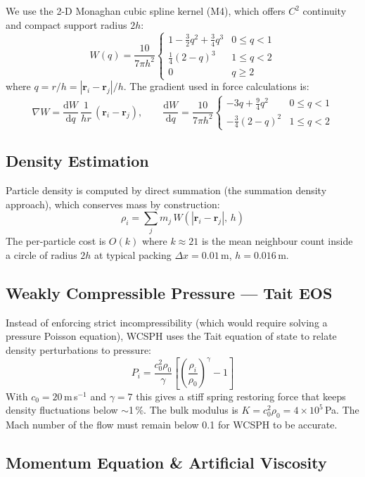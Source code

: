 \documentclass[11pt,a4paper]{article}
\begin{document}
We use the 2-D Monaghan cubic spline kernel (M4), which offers $C^2$ continuity and compact
support radius $2h$:
\[
  W(q) = \frac{10}{7\pi h^2}
  \begin{cases}
    1 - \tfrac{3}{2}q^2 + \tfrac{3}{4}q^3 & 0 \le q < 1 \\[4pt]
    \tfrac{1}{4}(2-q)^3                    & 1 \le q < 2 \\[4pt]
    0                                       & q \ge 2
  \end{cases}
\]
where $q = r/h = |\mathbf{r}_i - \mathbf{r}_j|/h$.  The gradient used in force calculations is:
\[
  \nabla W = \frac{\mathrm{d}W}{\mathrm{d}q}\,\frac{1}{hr}\,(\mathbf{r}_i - \mathbf{r}_j),
  \qquad
  \frac{\mathrm{d}W}{\mathrm{d}q} = \frac{10}{7\pi h^2}
  \begin{cases}
    -3q + \tfrac{9}{4}q^2 & 0 \le q < 1 \\[4pt]
    -\tfrac{3}{4}(2-q)^2  & 1 \le q < 2
  \end{cases}
\]

\subsection{Density Estimation}

Particle density is computed by direct summation (the summation density approach), which
conserves mass by construction:
\[
  \rho_i = \sum_j m_j\,W(|\mathbf{r}_i - \mathbf{r}_j|,\,h)
\]
The per-particle cost is $O(k)$ where $k \approx 21$ is the mean neighbour count inside a
circle of radius $2h$ at typical packing $\Delta x = 0.01$\,m, $h = 0.016$\,m.

\subsection{Weakly Compressible Pressure — Tait EOS}

Instead of enforcing strict incompressibility (which would require solving a pressure Poisson
equation), WCSPH uses the Tait equation of state to relate density perturbations to pressure:
\[
  P_i = \frac{c_0^2 \rho_0}{\gamma}
        \left[\left(\frac{\rho_i}{\rho_0}\right)^{\!\gamma} - 1\right]
\]
With $c_0 = 20$\,m\,s$^{-1}$ and $\gamma = 7$ this gives a stiff spring restoring force that keeps
density fluctuations below $\sim$1\,\%.  The bulk modulus is $K = c_0^2\rho_0 = 4\times10^5$\,Pa.
The Mach number of the flow must remain below 0.1 for WCSPH to be accurate.

\subsection{Momentum Equation \& Artificial Viscosity}
\end{document}
